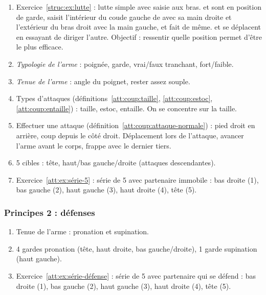 \begin{enumerate}
	\item Exercice~\ref{struc:ex:lutte} : lutte simple avec saisie aux bras.
	\A et \D sont en position de garde, \A saisit l'intérieur du coude gauche de \D avec sa main droite et l'extérieur du bras droit avec la main gauche, et \D fait de même.
	\A et \D se déplacent en essayant de diriger l'autre.
	Objectif : ressentir quelle position permet d'être le plus efficace.
	


	\item \emph{Typologie de l'arme} : poignée, garde, vrai/faux tranchant, fort/faible.
	
	\item \emph{Tenue de l'arme} : angle du poignet, rester assez souple.

	\item Types d'attaques (définitions~\ref{att:coup:taille}, \ref{att:coup:estoc}, \ref{att:coup:entaille}) : taille, estoc, entaille.
	On se concentre sur la taille.
	
	\item Effectuer une attaque (définition~\ref{att:coup:attaque-normale}) : pied droit en arrière, coup depuis le côté droit.
	Déplacement lors de l'attaque, avancer l'arme avant le corps, frappe avec le dernier tiers.
	
	\item 5 cibles : tête, haut/bas gauche/droite (attaques descendantes).
	
	\item Exercice~\ref{att:ex:série-5} : série de 5 avec partenaire immobile : bas droite (1), bas gauche (2), haut gauche (3), haut droite (4), tête (5).
\end{enumerate}


\subsubsection{Principes 2 : défenses}


\begin{enumerate}
	\item Tenue de l'arme : pronation et supination.

	\item 4 gardes pronation (tête, haut droite, bas gauche/droite), 1 garde supination (haut gauche).
	
	\item Exercice~\ref{att:ex:série-défense} : série de 5 avec partenaire qui se défend : bas droite (1), bas gauche (2), haut gauche (3), haut droite (4), tête (5).
\end{enumerate}


